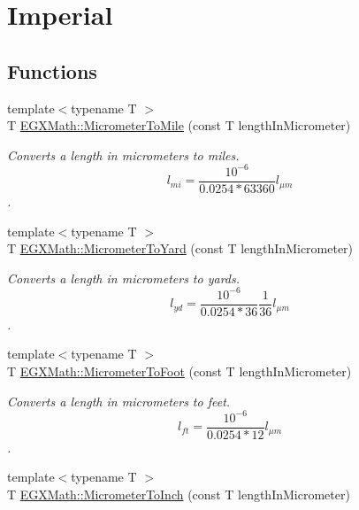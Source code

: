 \hypertarget{group___e_g_x_math-_conversions-_length_conversions-_s_i-_micrometer-_imperial}{}\section{Imperial}
\label{group___e_g_x_math-_conversions-_length_conversions-_s_i-_micrometer-_imperial}
\subsection*{Functions}
\begin{DoxyCompactItemize}
\item 
{\footnotesize template$<$typename T $>$ }\\T \mbox{\hyperlink{group___e_g_x_math-_conversions-_length_conversions-_s_i-_micrometer-_imperial_ga0419c861d5edc78538ff023c12b9b6d9}{E\+G\+X\+Math\+::\+Micrometer\+To\+Mile}} (const T length\+In\+Micrometer)
\begin{DoxyCompactList}\small\item\em Converts a length in micrometers to miles. \[ l_{mi}=\frac{10^{-6}}{0.0254 * 63360} l_{\mu m} \]. \end{DoxyCompactList}\item 
{\footnotesize template$<$typename T $>$ }\\T \mbox{\hyperlink{group___e_g_x_math-_conversions-_length_conversions-_s_i-_micrometer-_imperial_ga3152a5a36ea33c2ab85fe275569f5ac0}{E\+G\+X\+Math\+::\+Micrometer\+To\+Yard}} (const T length\+In\+Micrometer)
\begin{DoxyCompactList}\small\item\em Converts a length in micrometers to yards. \[ l_{yd}= \frac{10^{-6}}{0.0254 * 36} \frac{1}{36} l_{\mu m} \]. \end{DoxyCompactList}\item 
{\footnotesize template$<$typename T $>$ }\\T \mbox{\hyperlink{group___e_g_x_math-_conversions-_length_conversions-_s_i-_micrometer-_imperial_gaed71a8fede89b4bc87d3967e4d99c30d}{E\+G\+X\+Math\+::\+Micrometer\+To\+Foot}} (const T length\+In\+Micrometer)
\begin{DoxyCompactList}\small\item\em Converts a length in micrometers to feet. \[ l_{ft}= \frac{10^{-6}}{0.0254 * 12} l_{\mu m} \]. \end{DoxyCompactList}\item 
{\footnotesize template$<$typename T $>$ }\\T \mbox{\hyperlink{group___e_g_x_math-_conversions-_length_conversions-_s_i-_micrometer-_imperial_gad372acac36a8ca7f56b26858dd01546b}{E\+G\+X\+Math\+::\+Micrometer\+To\+Inch}} (const T length\+In\+Micrometer)

\end{DoxyCompactItemize}
